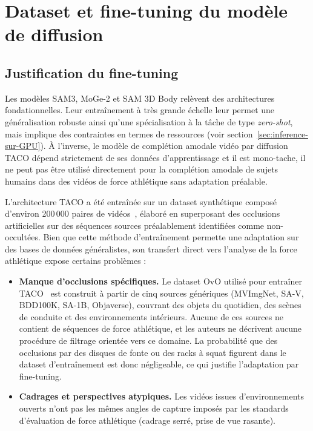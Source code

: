 \chapter{Dataset et fine-tuning du modèle de diffusion} \label{ch_four}

\section{Justification du fine-tuning}

Les modèles SAM3, MoGe-2 et SAM 3D Body relèvent des architectures fondationnelles. Leur entraînement à très grande échelle leur permet une généralisation robuste ainsi qu'une spécialisation à la tâche de type \textit{zero-shot}, mais implique des contraintes en termes de ressources (voir section~\ref{sec:inference-sur-GPU}). À l'inverse, le modèle de complétion amodale vidéo par diffusion TACO dépend strictement de ses données d'apprentissage et il est mono-tache, il ne peut pas être utilisé directement pour la complétion amodale de sujets humains dans des vidéos de force athlétique sans adaptation préalable.

L'architecture TACO a été entraînée sur un dataset synthétique composé d'environ 200\,000 paires de vidéos~\cite{TACO-2025}, élaboré en superposant des occlusions artificielles sur des séquences sources préalablement identifiées comme non-occultées. Bien que cette méthode d'entraînement permette une adaptation sur des bases de données généralistes, son transfert direct vers l'analyse de la force athlétique expose certains problèmes :

\begin{itemize}
  \item \textbf{Manque d'occlusions spécifiques.} Le dataset OvO utilisé pour entraîner TACO~\cite{TACO-2025} est construit à partir de cinq sources génériques (MVImgNet, SA-V, BDD100K, SA-1B, Objaverse), couvrant des objets du quotidien, des scènes de conduite et des environnements intérieurs. Aucune de ces sources ne contient de séquences de force athlétique, et les auteurs ne décrivent aucune procédure de filtrage orientée vers ce domaine. La probabilité que des occlusions par des disques de fonte ou des racks à squat figurent dans le dataset d'entraînement est donc négligeable, ce qui justifie l'adaptation par fine-tuning.
  \item \textbf{Cadrages et perspectives atypiques.} Les vidéos issues d'environnements ouverts n'ont pas les mêmes angles de capture imposés par les standards d'évaluation de force athlétique (cadrage serré, prise de vue rasante).
\end{itemize}

